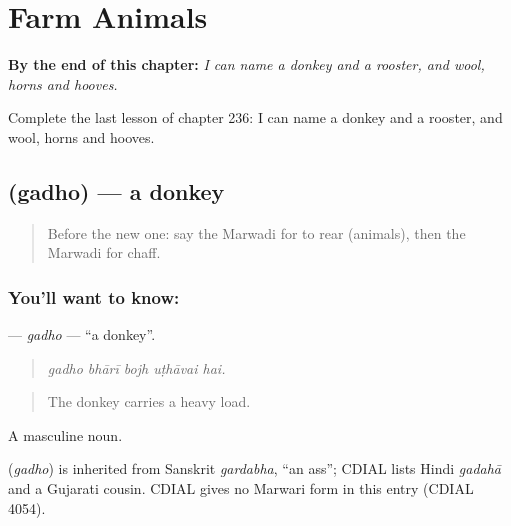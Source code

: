 
\chapter{Farm Animals}
\label{ch:mw-farm-animals}

\begin{chapteropening}
\textbf{By the end of this chapter:} \emph{I can name a donkey and a rooster, and wool, horns and hooves.}

Complete the last lesson of chapter 236: I can name a donkey and a rooster, and wool, horns and hooves.
\end{chapteropening}

\section[\texorpdfstring{\mw{गधो} (gadho)}{गधो (gadho)}]{ (gadho) — a donkey}

\label{lesson:MW-C236-gadho}



\begin{quote}
Before the new one: say the Marwadi for to rear (animals), then the Marwadi for chaff.
\end{quote}

\subsection*{You'll want to know: }
\textbf{} — \emph{gadho} — \textquotedblleft{}a donkey\textquotedblright{}.

\begin{quote}
    
\end{quote}

\begin{quote}
\emph{gadho bhārī bojh uṭhāvai hai.}
\end{quote}

\begin{quote}
The donkey carries a heavy load.
\end{quote}

A masculine noun.

\begin{cousinweb}
\textbf{} (\emph{gadho}) is inherited from Sanskrit \emph{gardabha}, \textquotedblleft{}an ass\textquotedblright{}; CDIAL lists Hindi \emph{gadahā} and a Gujarati cousin. CDIAL gives no Marwari form in this entry (CDIAL 4054).
\end{cousinweb}

